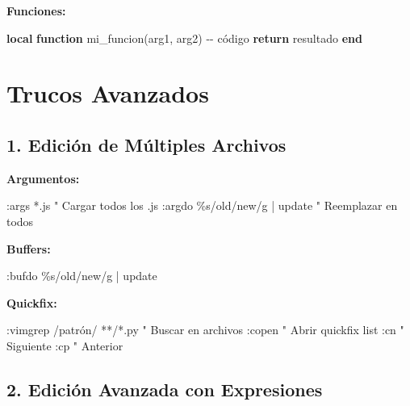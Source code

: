 \documentclass[
  doc,
  floatsintext,
  longtable,
  a4paper,
  nolmodern,
  notxfonts,
  notimes,
  12pt,
  colorlinks=true,linkcolor=blue,citecolor=blue,urlcolor=blue]{apa7}
\newenvironment{Shaded}{\begin{snugshade}}{\end{snugshade}}
\newcommand{\CommentTok}[1]{\textcolor[rgb]{0.37,0.37,0.37}{#1}}
\newcommand{\ControlFlowTok}[1]{\textcolor[rgb]{0.00,0.23,0.31}{\textbf{#1}}}
\newcommand{\KeywordTok}[1]{\textcolor[rgb]{0.00,0.23,0.31}{\textbf{#1}}}
\newcommand{\NormalTok}[1]{\textcolor[rgb]{0.00,0.23,0.31}{#1}}
\newcommand{\OperatorTok}[1]{\textcolor[rgb]{0.37,0.37,0.37}{#1}}
\newcommand{\VariableTok}[1]{\textcolor[rgb]{0.07,0.07,0.07}{#1}}
\begin{document}
\textbf{Funciones:}

\begin{Shaded}
\begin{Highlighting}[]
\KeywordTok{local} \KeywordTok{function}\NormalTok{ mi\_funcion}\OperatorTok{(}\VariableTok{arg1}\OperatorTok{,} \VariableTok{arg2}\OperatorTok{)}
    \CommentTok{{-}{-} código}
    \ControlFlowTok{return} \VariableTok{resultado}
\KeywordTok{end}
\end{Highlighting}
\end{Shaded}

\section{Trucos Avanzados}\label{trucos-avanzados}

\subsection{1. Edición de Múltiples
Archivos}\label{ediciuxf3n-de-muxfaltiples-archivos}

\textbf{Argumentos:}

\begin{Shaded}
\begin{Highlighting}[]
\NormalTok{:args *.js          " Cargar todos los .js}
\NormalTok{:argdo \%s/old/new/g | update  " Reemplazar en todos}
\end{Highlighting}
\end{Shaded}

\textbf{Buffers:}

\begin{Shaded}
\begin{Highlighting}[]
\NormalTok{:bufdo \%s/old/new/g | update}
\end{Highlighting}
\end{Shaded}

\textbf{Quickfix:}

\begin{Shaded}
\begin{Highlighting}[]
\NormalTok{:vimgrep /patrón/ **/*.py   " Buscar en archivos}
\NormalTok{:copen                      " Abrir quickfix list}
\NormalTok{:cn                         " Siguiente}
\NormalTok{:cp                         " Anterior}
\end{Highlighting}
\end{Shaded}

\subsection{2. Edición Avanzada con
Expresiones}\label{ediciuxf3n-avanzada-con-expresiones}
\end{document}
